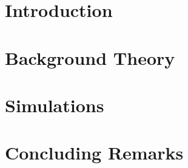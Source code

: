 \documentclass[12pt, final]{extbook}
\begin{document}


\makefront
    






\tableofcontents
\listoffigures
\listoftables


\configureMainPart

% 
%

\chapter{Introduction}
\label{chap:introduction}


\chapter{Background Theory}
\label{chap:theoryAndModelling}


\chapter{Simulations}
\label{chap:simulations}


\chapter{Concluding Remarks}
\label{chap:concludingRemarks}





% 
\end{document}
